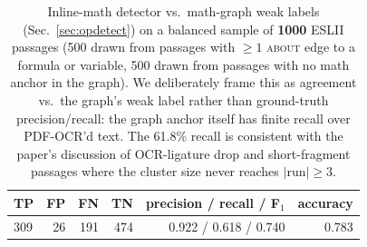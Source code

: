 \begin{table}[!htbp]
\centering
\caption{Inline-math detector vs.\ math-graph weak labels (Sec.~\ref{sec:opdetect}) on a balanced sample of \textbf{1000} ESLII passages (500 drawn from passages with $\ge\!1$ \textsc{about} edge to a formula or variable, 500 drawn from passages with no math anchor in the graph).  We deliberately frame this as agreement vs.\ the graph's weak label rather than ground-truth precision/recall: the graph anchor itself has finite recall over PDF-OCR'd text. The 61.8\% recall is consistent with the paper's discussion of OCR-ligature drop and short-fragment passages where the cluster size never reaches $|\mathrm{run}|\!\ge\!3$.}
\label{tab:m5-inline-math}
\small
\begin{tabular}{lrrrrr}
\toprule
TP & FP & FN & TN & precision / recall / F$_1$ & accuracy \\
\midrule
309 & 26 & 191 & 474 & 0.922 / 0.618 / 0.740 & 0.783 \\
\bottomrule
\end{tabular}
\end{table}
